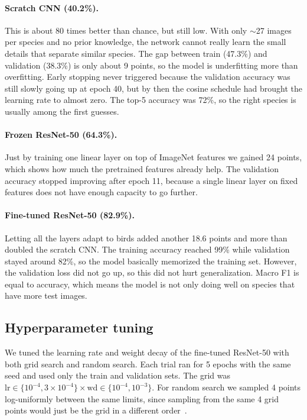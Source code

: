 \documentclass[11pt,a4paper]{article}
\begin{document}
\paragraph{Scratch CNN (40.2\%).} This is about 80 times better than chance, but still low. With only $\sim$27 images per species and no prior knowledge, the network cannot really learn the small details that separate similar species. The gap between train (47.3\%) and validation (38.3\%) is only about 9 points, so the model is underfitting more than overfitting. Early stopping never triggered because the validation accuracy was still slowly going up at epoch 40, but by then the cosine schedule had brought the learning rate to almost zero. The top-5 accuracy was 72\%, so the right species is usually among the first guesses.

\paragraph{Frozen ResNet-50 (64.3\%).} Just by training one linear layer on top of ImageNet features we gained 24 points, which shows how much the pretrained features already help. The validation accuracy stopped improving after epoch 11, because a single linear layer on fixed features does not have enough capacity to go further.

\paragraph{Fine-tuned ResNet-50 (82.9\%).} Letting all the layers adapt to birds added another 18.6 points and more than doubled the scratch CNN. The training accuracy reached 99\% while validation stayed around 82\%, so the model basically memorized the training set. However, the validation loss did not go up, so this did not hurt generalization. Macro F1 is equal to accuracy, which means the model is not only doing well on species that have more test images.

\subsection{Hyperparameter tuning}

We tuned the learning rate and weight decay of the fine-tuned ResNet-50 with both grid search and random search. Each trial ran for 5 epochs with the same seed and used only the train and validation sets. The grid was $\text{lr}\in\{10^{-4}, 3\times10^{-4}\}\times\text{wd}\in\{10^{-4},10^{-3}\}$. For random search we sampled 4 points log-uniformly between the same limits, since sampling from the same 4 grid points would just be the grid in a different order~\cite{bergstra2012random}.
\end{document}
